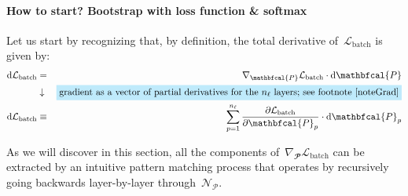 \documentclass{article}
\newcommand{\centerwithin}[2]{%
  {\mathmakebox[\widthof{\ensuremath{{}#2{}}}][c]{{#1}}}}
\begin{document}
\paragraph{How to start? Bootstrap with loss function \& softmax}  Let us start by recognizing that, by definition, the total derivative of~$\mathcal{L}_\text{batch}$ is given by:
\begin{eqnarray}
\text{d} \mathcal{L}_\text{batch} &=& \nabla_\mathbfcal{P} \mathcal{L}_\text{batch} \cdot \text{d} \mathbfcal{P} \nonumber \\
&\downarrow& \colorbox{light-blue}{gradient as a vector of partial derivatives for the~$n_\ell$ layers; see footnote~\ref{noteGrad}} \nonumber \\
\text{d} \mathcal{L}_\text{batch} &\equiv& \sum_{p=1}^{n_\ell} \frac{\partial \mathcal{L}_{\text{batch}}}{\partial \mathbfcal{P}_p} \cdot \text{d}\mathbfcal{P}_p \label{eq:gradientFormal}
\end{eqnarray}

\newcommand\tempboxBootStrap{%
\begin{minipage}{0.2\textwidth}%
\abovedisplayskip=0pt
\belowdisplayskip=0pt
\begin{align*}
\text{d} \mathcal{L}_\text{batch} &= \sum_\text{samples} \text{d} {\bf \ell}_\mathbfcal{P} \left( {\bf Y}_\text{gt} , {\bf Y}_\text{pred} \right) \\
&\centerwithin{\downarrow}{=} \colorbox{light-blue}{using eq.~\eqref{totalVectorToScalar}} \\
&= \sum_\text{samples} \nabla {\bf \ell}_\mathbfcal{P} \left( {\bf Y}_\text{gt} , {\bf Y}_\text{pred} \right) \ominus \text{d} {\bf Y}_\text{pred} \\
&\centerwithin{\downarrow}{=} \colorbox{light-blue}{using eq.~\eqref{rowWise::Froebenius}} \\
& = \nabla {\bf \ell}_\mathbfcal{P} \left( {\bf Y}_\text{gt} , {\bf Y}_\text{pred} \right) \cdot \text{d} {\bf Y}_\text{pred}
\end{align*}
\end{minipage}}

\noindent As we will discover in this section, all the components of~$\nabla_\mathbfcal{P} \mathcal{L}_\text{batch}$ can be extracted by an intuitive pattern matching process that operates by recursively going backwards layer-by-layer through~$\mathcal{N}_\mathcal{P}$. \\
\end{document}
